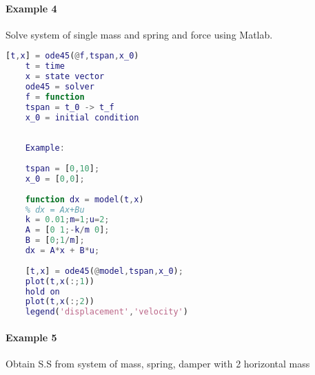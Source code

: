 \paragraph{Example 4} Solve system of single mass and spring and force using Matlab. 
\begin{lstlisting}[language=MATLAB,title=MATLAB Numerical Method using ode45(Runge Kutta)]
	[t,x] = ode45(@f,tspan,x_0)
	t = time
	x = state vector
	ode45 = solver
	f = function
	tspan = t_0 -> t_f
	x_0 = initial condition
	
	
	Example:
	
	tspan = [0,10];
	x_0 = [0,0];
	
	function dx = model(t,x)
	% dx = Ax+Bu
	k = 0.01;m=1;u=2;
	A = [0 1;-k/m 0];
	B = [0;1/m];
	dx = A*x + B*u;
	
	[t,x] = ode45(@model,tspan,x_0);
	plot(t,x(:;1))
	hold on
	plot(t,x(:;2))
	legend('displacement','velocity')
\end{lstlisting}

\paragraph{Example 5} Obtain S.S from system of mass, spring, damper with 2 horizontal mass

\begin{figure}[ht]
	\centering
	
\end{figure}


